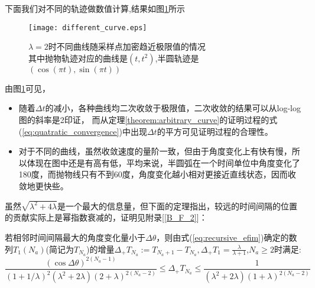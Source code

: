 下面我们对不同的轨迹做数值计算,结果如图\ref{figure:tend_to_limit}所示
\begin{figure}
  \centering
  \texttt{[image: different\_curve.eps]}
  \caption{$\lambda=2$时不同曲线随采样点加密趋近极限值的情况\\其中抛物轨迹对应的曲线是$(t,t^2)$,半圆轨迹是$(\cos(\pi t),\sin(\pi t))$}\label{figure:tend_to_limit}
\end{figure}
由图\ref{figure:tend_to_limit}可见，
\begin{itemize}
  \item 随着$\Delta t$的减小，各种曲线均二次收敛于极限值，二次收敛的结果可以从log-log图的斜率是2印证，
而从定理\ref{theorem:arbitrary_curve}的证明过程的式(\ref{eq:quatratic_convergence})中出现$\Delta t$的平方可见证明过程的合理性。
  \item 对于不同的曲线，虽然收敛速度的量阶一致，但由于角度变化上有快有慢，所以体现在图中还是有高有低，平均来说，半圆弧在一个时间单位中角度变化了180度，而抛物线只有不到60度，角度变化越小相对更接近直线状态，因而收敛地更快些。
\end{itemize}
虽然$\sqrt{\lambda^2+4\lambda}$是一个最大的信息量，但下面的定理指出，较远的时间间隔的位置的贡献实际上是幂指数衰减的，证明见附录[\ref{B_F_2}]：
\begin{theorem}\label{theorem:exponential_decreasing}
若相邻时间间隔最大的角度变化量小于$\Delta \theta$，则由式(\ref{eq:recursive_efim})确定的数列$T_1(N_a)$(简记为$T_{N_a}$)的增量$\Delta_{+} T_{N_a}:=T_{N_a+1}-T_{N_a},\Delta_{+} T_{1}=\frac{\lambda}{\lambda+1}$,$N_a\geq 2$时满足:
\[
\frac{(\cos\Delta\theta)^{2(N_a-1)}}{(1+1/\lambda)^2(\lambda^2+2\lambda)(2+\lambda)^{2(N_a-2)}}\leq \Delta_{+} T_{N_a}\leq\frac{1}{(\lambda^2+2\lambda)(1+\lambda)^{2(N_a-2)}}
\]
\end{theorem}
